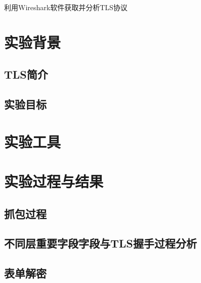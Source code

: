 \begin{center}
	\large{利用Wireshark软件获取并分析TLS协议}\\
\end{center}
\begin{flushleft}
	\tableofcontents
	\section{实验背景}
		\subsection{TLS简介}
			
		\subsection{实验目标}
			
	\section{实验工具}
		
	\section{实验过程与结果}
		\subsection{抓包过程}
			
		\subsection{不同层重要字段字段与TLS握手过程分析}
			
		\subsection{表单解密}
			
	
\end{flushleft}